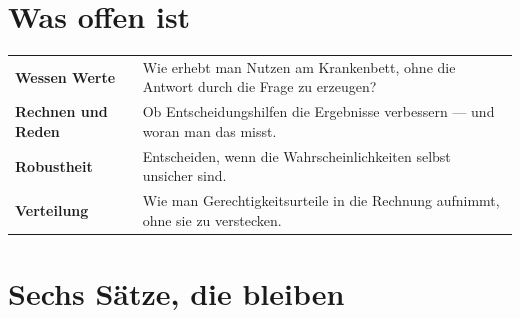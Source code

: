 \section{Was offen ist}

\begin{merksatz}
\begin{center}
{\small
\renewcommand{\arraystretch}{1.55}
\begin{tabular}{@{}P{3.0cm}P{5.6cm}@{}}
\toprule
\textbf{Wessen Werte} & Wie erhebt man Nutzen am Krankenbett, ohne die Antwort durch die Frage zu erzeugen?\\
\textbf{Rechnen und Reden} & Ob Entscheidungshilfen die Ergebnisse verbessern --- und woran man das misst.\\
\textbf{Robustheit} & Entscheiden, wenn die Wahrscheinlichkeiten selbst unsicher sind.\\
\textbf{Verteilung} & Wie man Gerechtigkeitsurteile in die Rechnung aufnimmt, ohne sie zu verstecken.\\
\bottomrule
\end{tabular}}
\end{center}

\begin{center}
\begin{minipage}{0.88\textwidth}
\end{minipage}
\end{center}
\end{merksatz}

\section{Sechs Sätze, die bleiben}

